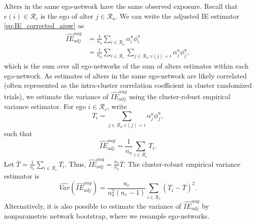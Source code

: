 \documentclass[11pt]{article}
\theoremstyle{definition}
\def \cR {\mathcal{R}}
\begin{document}
Alters in the same ego-network have the same observed exposure.
Recall that $e(i) \in \cR_e$ is the ego of alter $j \in \cR_a$.
We can write the adjusted IE estimator \eqref{eq:IE_corrected_aipw} as
\begin{equation*}
    \begin{aligned}
        \widehat{IE}_{adj}^{aug} &= 
        \frac{1}{n_a}
    \sum_{i \in \cR_a}
    \alpha_i^a \phi_i^a
    \\ &=
    \frac{1}{n_a}
    \sum_{i \in \cR_e}
    \sum_{j \in \cR_a : e(j)=i}
    \alpha_j^a \phi_j^a,
    \end{aligned}
\end{equation*}
which is the sum over all ego-networks of the sum of alters estimates within each ego-network.
As estimates of alters in the same ego-network are likely correlated (often represented as the intra-cluster correlation coefficient in cluster randomized trials),
we estimate the variance of $\widehat{IE}_{adj}^{aug}$ using the cluster-robust empirical variance estimator. For ego $i \in \cR_e$, write
\begin{equation*}
    T_i = \sum_{j \in \cR_a : e(j)=i}
    \alpha_j^a \phi_j^a,
\end{equation*}
such that 
\begin{equation*}
    \widehat{IE}_{adj}^{aug}=
     \frac{1}{n_a}
    \sum_{i \in \cR_e} T_i.
\end{equation*}
Let $\overline{T} = \frac{1}{n_e} \sum_{i \in \cR_e} T_i$.
Thus, $\widehat{IE}_{adj}^{aug} = \frac{n_e}{n_a} \overline{T}$. The cluster-robust empirical variance estimator is 
\begin{equation*}
    \widehat{Var}\left(\widehat{IE}_{adj}^{aug}\right)
    =
    \frac{n_e}{n_a^2(n_e-1)}
    \sum_{i \in \cR_e} 
    \left(
    T_i - \overline{T}
    \right)^2.
\end{equation*}
Alternatively, it is also possible to estimate the variance of $\widehat{IE}_{adj}^{aug}$ by nonparametric network bootstrap, where we resample ego-networks.
\end{document}
